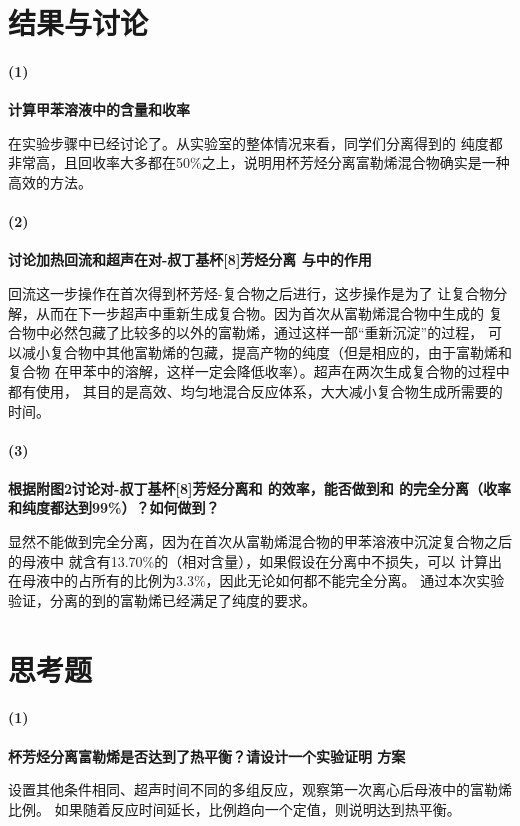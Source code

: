 \documentclass[a4paper,zihao=5,UTF8]{ctexart}
\begin{document}
    \section{结果与讨论}
    \paragraph{(1)}\textbf{计算甲苯溶液中的含量和收率}
    \par 在实验步骤中已经讨论了。从实验室的整体情况来看，同学们分离得到的
    纯度都非常高，且回收率大多都在50\%之上，说明用杯芳烃分离富勒烯混合物确实是一种
    高效的方法。
    \paragraph{(2)}\textbf{讨论加热回流和超声在对-叔丁基杯[8]芳烃分离
    与中的作用}
    \par 回流这一步操作在首次得到杯芳烃-复合物之后进行，这步操作是为了
    让复合物分解，从而在下一步超声中重新生成复合物。因为首次从富勒烯混合物中生成的
    复合物中必然包藏了比较多的以外的富勒烯，通过这样一部“重新沉淀”的过程，
    可以减小复合物中其他富勒烯的包藏，提高产物的纯度（但是相应的，由于富勒烯和复合物
    在甲苯中的溶解，这样一定会降低收率）。超声在两次生成复合物的过程中都有使用，
    其目的是高效、均匀地混合反应体系，大大减小复合物生成所需要的时间。
    \paragraph{(3)}\textbf{根据附图2讨论对-叔丁基杯[8]芳烃分离和
    的效率，能否做到和
    的完全分离（收率和纯度都达到99\%）？如何做到？}
    \par 显然不能做到完全分离，因为在首次从富勒烯混合物的甲苯溶液中沉淀复合物之后的母液中
    就含有13.70\%的（相对含量），如果假设在分离中不损失，可以
    计算出在母液中的占所有的比例为3.3\%，因此无论如何都不能完全分离。
    通过本次实验验证，分离的到的富勒烯已经满足了纯度的要求。

    \section{思考题}
    \paragraph{(1)}\textbf{杯芳烃分离富勒烯是否达到了热平衡？请设计一个实验证明
    方案}
    \par 
    设置其他条件相同、超声时间不同的多组反应，观察第一次离心后母液中的富勒烯比例。
    如果随着反应时间延长，比例趋向一个定值，则说明达到热平衡。
\end{document}
